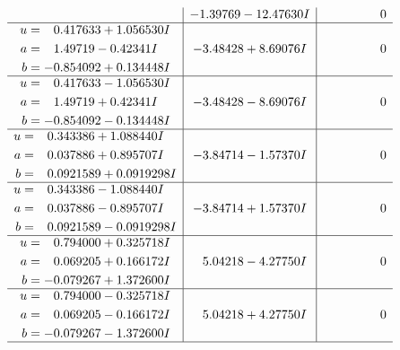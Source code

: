 \documentclass[1p]{elsarticle_modified}
\theoremstyle{definition}
\begin{document}
$$\begin{array}{c|c|c}
 & -1.39769 - 12.47630 I & \phantom{-0.000000 } 0 \\ \hline\begin{aligned}
u &= \phantom{-}0.417633 + 1.056530 I \\
a &= \phantom{-}1.49719 - 0.42341 I \\
b &= -0.854092 + 0.134448 I\end{aligned}
 & -3.48428 + 8.69076 I & \phantom{-0.000000 } 0 \\ \hline\begin{aligned}
u &= \phantom{-}0.417633 - 1.056530 I \\
a &= \phantom{-}1.49719 + 0.42341 I \\
b &= -0.854092 - 0.134448 I\end{aligned}
 & -3.48428 - 8.69076 I & \phantom{-0.000000 } 0 \\ \hline\begin{aligned}
u &= \phantom{-}0.343386 + 1.088440 I \\
a &= \phantom{-}0.037886 + 0.895707 I \\
b &= \phantom{-}0.0921589 + 0.0919298 I\end{aligned}
 & -3.84714 - 1.57370 I & \phantom{-0.000000 } 0 \\ \hline\begin{aligned}
u &= \phantom{-}0.343386 - 1.088440 I \\
a &= \phantom{-}0.037886 - 0.895707 I \\
b &= \phantom{-}0.0921589 - 0.0919298 I\end{aligned}
 & -3.84714 + 1.57370 I & \phantom{-0.000000 } 0 \\ \hline\begin{aligned}
u &= \phantom{-}0.794000 + 0.325718 I \\
a &= \phantom{-}0.069205 + 0.166172 I \\
b &= -0.079267 + 1.372600 I\end{aligned}
 & \phantom{-}5.04218 - 4.27750 I & \phantom{-0.000000 } 0 \\ \hline\begin{aligned}
u &= \phantom{-}0.794000 - 0.325718 I \\
a &= \phantom{-}0.069205 - 0.166172 I \\
b &= -0.079267 - 1.372600 I\end{aligned}
 & \phantom{-}5.04218 + 4.27750 I & \phantom{-0.000000 } 0\\
 \hline 
 \end{array}$$\newpage$$\begin{array}{c|c|c}  

\end{array}$$
\end{document}
